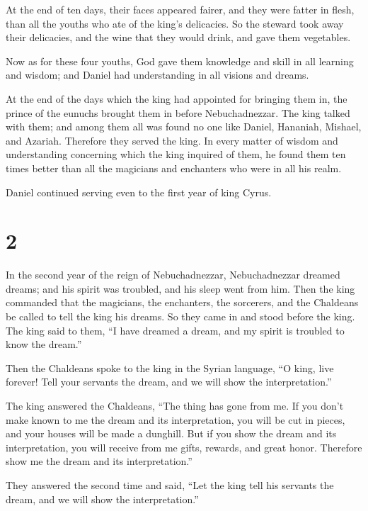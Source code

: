  At the end of ten days, their faces appeared fairer, and
they were fatter in flesh, than all the youths who ate of the king's
delicacies.  So the steward took away their delicacies,
and the wine that they would drink, and gave them vegetables.

 Now as for these four youths, God gave them knowledge
and skill in all learning and wisdom; and Daniel had understanding in
all visions and dreams.

 At the end of the days which the king had appointed for
bringing them in, the prince of the eunuchs brought them in before
Nebuchadnezzar.  The king talked with them; and among
them all was found no one like Daniel, Hananiah, Mishael, and Azariah.
Therefore they served the king.  In every matter of
wisdom and understanding concerning which the king inquired of them, he
found them ten times better than all the magicians and enchanters who
were in all his realm.

 Daniel continued serving even to the first year of king
Cyrus.

\hypertarget{section-1}{%
\section{2}\label{section-1}}

 In the second year of the reign of Nebuchadnezzar,
Nebuchadnezzar dreamed dreams; and his spirit was troubled, and his
sleep went from him.  Then the king commanded that the
magicians, the enchanters, the sorcerers, and the Chaldeans be called to
tell the king his dreams. So they came in and stood before the king.
 The king said to them, ``I have dreamed a dream, and my
spirit is troubled to know the dream.''

 Then the Chaldeans spoke to the king in the Syrian
language, ``O king, live forever! Tell your servants the dream, and we
will show the interpretation.''

 The king answered the Chaldeans, ``The thing has gone
from me. If you don't make known to me the dream and its interpretation,
you will be cut in pieces, and your houses will be made a dunghill.
 But if you show the dream and its interpretation, you
will receive from me gifts, rewards, and great honor. Therefore show me
the dream and its interpretation.''

 They answered the second time and said, ``Let the king
tell his servants the dream, and we will show the interpretation.''

